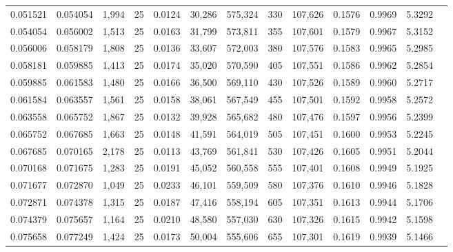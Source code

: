 \begin{tabular}{rrrrrrrrrrrrr}
0.051521 & 0.054054 & 1,994 &  25 &                                     0.0124 &  30,286 & 575,324 &     330 & 107,626 & 0.1576 & 0.9969 & 5.3292 \\
0.054054 & 0.056002 & 1,513 &  25 &                                     0.0163 &  31,799 & 573,811 &     355 & 107,601 & 0.1579 & 0.9967 & 5.3152 \\
0.056006 & 0.058179 & 1,808 &  25 &                                     0.0136 &  33,607 & 572,003 &     380 & 107,576 & 0.1583 & 0.9965 & 5.2985 \\
0.058181 & 0.059885 & 1,413 &  25 &                                     0.0174 &  35,020 & 570,590 &     405 & 107,551 & 0.1586 & 0.9962 & 5.2854 \\
0.059885 & 0.061583 & 1,480 &  25 &                                     0.0166 &  36,500 & 569,110 &     430 & 107,526 & 0.1589 & 0.9960 & 5.2717 \\
0.061584 & 0.063557 & 1,561 &  25 &                                     0.0158 &  38,061 & 567,549 &     455 & 107,501 & 0.1592 & 0.9958 & 5.2572 \\
0.063558 & 0.065752 & 1,867 &  25 &                                     0.0132 &  39,928 & 565,682 &     480 & 107,476 & 0.1597 & 0.9956 & 5.2399 \\
0.065752 & 0.067685 & 1,663 &  25 &                                     0.0148 &  41,591 & 564,019 &     505 & 107,451 & 0.1600 & 0.9953 & 5.2245 \\
0.067685 & 0.070165 & 2,178 &  25 &                                     0.0113 &  43,769 & 561,841 &     530 & 107,426 & 0.1605 & 0.9951 & 5.2044 \\
0.070168 & 0.071675 & 1,283 &  25 &                                     0.0191 &  45,052 & 560,558 &     555 & 107,401 & 0.1608 & 0.9949 & 5.1925 \\
0.071677 & 0.072870 & 1,049 &  25 &                                     0.0233 &  46,101 & 559,509 &     580 & 107,376 & 0.1610 & 0.9946 & 5.1828 \\
0.072871 & 0.074378 & 1,315 &  25 &                                     0.0187 &  47,416 & 558,194 &     605 & 107,351 & 0.1613 & 0.9944 & 5.1706 \\
0.074379 & 0.075657 & 1,164 &  25 &                                     0.0210 &  48,580 & 557,030 &     630 & 107,326 & 0.1615 & 0.9942 & 5.1598 \\
0.075658 & 0.077249 & 1,424 &  25 &                                     0.0173 &  50,004 & 555,606 &     655 & 107,301 & 0.1619 & 0.9939 & 5.1466 \\

\end{tabular}
